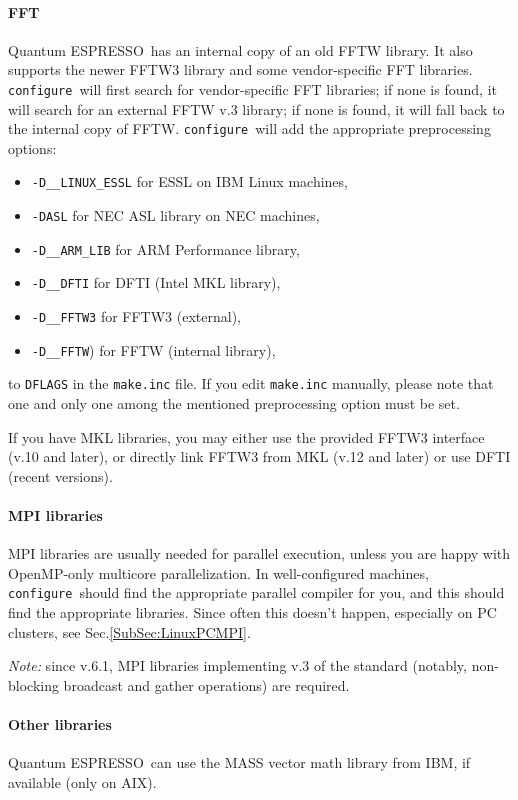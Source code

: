 \documentclass[12pt,a4paper]{article}
\def\qe{{\sc Quantum ESPRESSO}}
\def\configure{\texttt{configure}}
\begin{document}
\paragraph{FFT}
\qe\ has an internal copy of an old FFTW library. It also supports
the newer FFTW3 library and some vendor-specific FFT libraries.
\configure\ will first search for vendor-specific FFT libraries;
if none is found, it will search for an external FFTW v.3 library;
if none is found, it will fall back to the internal  copy of FFTW.
\configure\ will add the appropriate preprocessing options:
\begin{itemize}
\item \texttt{-D\_\_LINUX\_ESSL} for ESSL on IBM Linux machines,
\item \texttt{-DASL} for NEC ASL library on NEC machines,
\item \texttt{-D\_\_ARM\_LIB} for ARM Performance library,
\item \texttt{-D\_\_DFTI}  for DFTI (Intel MKL library),
\item \texttt{-D\_\_FFTW3} for FFTW3 (external),
\item \texttt{-D\_\_FFTW}) for FFTW (internal library),
\end{itemize}
to \texttt{DFLAGS} in the \texttt{make.inc} file.
If you edit \texttt{make.inc} manually, please note that one and
only one among the mentioned preprocessing option must be set.

If you have MKL libraries, you may either use the provided FFTW3
interface (v.10 and later), or directly link FFTW3 from MKL (v.12
and later) or use DFTI (recent versions).

\paragraph{MPI libraries}
MPI libraries are usually needed for parallel execution, unless you are 
happy with OpenMP-only multicore parallelization.
In well-configured machines, \configure\ should find the appropriate
parallel compiler for you, and this should find the appropriate
libraries. Since often this doesn't
happen, especially on PC clusters, see Sec.\ref{SubSec:LinuxPCMPI}.

{\em Note:} since v.6.1, MPI libraries implementing v.3 of the standard
(notably, non-blocking broadcast and gather operations) are required.


\paragraph{Other libraries}
\qe\ can use the MASS vector math
library from IBM, if available (only on AIX).
\end{document}
